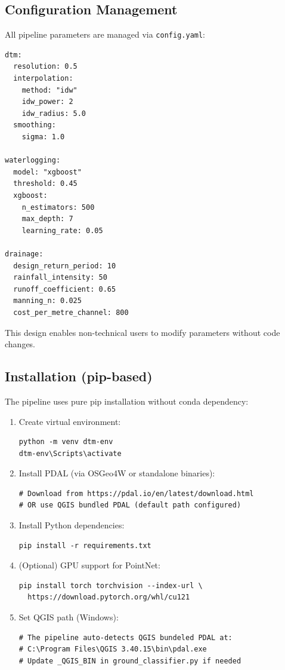 \documentclass[a4paper,12pt]{article}
\begin{document}
\subsection{Configuration Management}

All pipeline parameters are managed via \texttt{config.yaml}:

\begin{verbatim}
dtm:
  resolution: 0.5
  interpolation:
    method: "idw"
    idw_power: 2
    idw_radius: 5.0
  smoothing:
    sigma: 1.0

waterlogging:
  model: "xgboost"
  threshold: 0.45
  xgboost:
    n_estimators: 500
    max_depth: 7
    learning_rate: 0.05

drainage:
  design_return_period: 10
  rainfall_intensity: 50
  runoff_coefficient: 0.65
  manning_n: 0.025
  cost_per_metre_channel: 800
\end{verbatim}

This design enables non-technical users to modify parameters without code changes.

\subsection{Installation (pip-based)}

The pipeline uses pure pip installation without conda dependency:

\begin{enumerate}
	\item Create virtual environment:
	      \begin{verbatim}
python -m venv dtm-env
dtm-env\Scripts\activate
    \end{verbatim}

	\item Install PDAL (via OSGeo4W or standalone binaries):
	      \begin{verbatim}
# Download from https://pdal.io/en/latest/download.html
# OR use QGIS bundled PDAL (default path configured)
    \end{verbatim}

	\item Install Python dependencies:
	      \begin{verbatim}
pip install -r requirements.txt
    \end{verbatim}

	\item (Optional) GPU support for PointNet:
	      \begin{verbatim}
pip install torch torchvision --index-url \
  https://download.pytorch.org/whl/cu121
    \end{verbatim}

	\item Set QGIS path (Windows):
	      \begin{verbatim}
# The pipeline auto-detects QGIS bundeled PDAL at:
# C:\Program Files\QGIS 3.40.15\bin\pdal.exe
# Update _QGIS_BIN in ground_classifier.py if needed
    \end{verbatim}
\end{enumerate}
\end{document}
